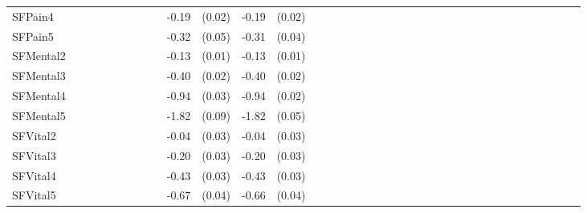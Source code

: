 {\begin{tabular}{l*{6}{llllll}}
SFPain4             &                     &            &                     &            &                     &            &                     &            &       -0.19\sym{***}&      (0.02)&       -0.19\sym{***}&      (0.02)\\
SFPain5             &                     &            &                     &            &                     &            &                     &            &       -0.32\sym{***}&      (0.05)&       -0.31\sym{***}&      (0.04)\\
SFMental2           &                     &            &                     &            &                     &            &                     &            &       -0.13\sym{***}&      (0.01)&       -0.13\sym{***}&      (0.01)\\
SFMental3           &                     &            &                     &            &                     &            &                     &            &       -0.40\sym{***}&      (0.02)&       -0.40\sym{***}&      (0.02)\\
SFMental4           &                     &            &                     &            &                     &            &                     &            &       -0.94\sym{***}&      (0.03)&       -0.94\sym{***}&      (0.02)\\
SFMental5           &                     &            &                     &            &                     &            &                     &            &       -1.82\sym{***}&      (0.09)&       -1.82\sym{***}&      (0.05)\\
SFVital2            &                     &            &                     &            &                     &            &                     &            &       -0.04         &      (0.03)&       -0.04         &      (0.03)\\
SFVital3            &                     &            &                     &            &                     &            &                     &            &       -0.20\sym{***}&      (0.03)&       -0.20\sym{***}&      (0.03)\\
SFVital4            &                     &            &                     &            &                     &            &                     &            &       -0.43\sym{***}&      (0.03)&       -0.43\sym{***}&      (0.03)\\
SFVital5            &                     &            &                     &            &                     &            &                     &            &       -0.67\sym{***}&      (0.04)&       -0.66\sym{***}&      (0.04)\\

\end{tabular}}

